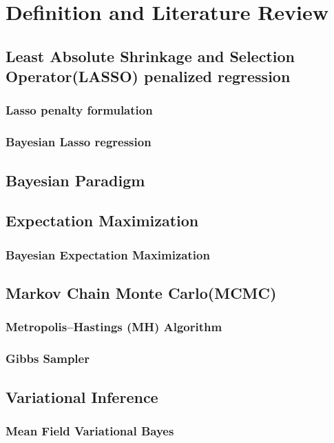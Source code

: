 \chapter{Definition and Literature Review}
\label{Chapter2}
\section{Least Absolute Shrinkage and Selection Operator(LASSO) penalized regression}
\subsection{Lasso penalty formulation}
\subsection{Bayesian Lasso regression}

\section{Bayesian Paradigm}

\section{Expectation Maximization}
\subsection{Bayesian Expectation Maximization}

\section{Markov Chain Monte Carlo(MCMC)}
\label{MCMC}
\subsection{Metropolis–Hastings (MH) Algorithm}
\subsection{Gibbs Sampler}

\section{Variational Inference}
\label{VI}
\subsection{Mean Field Variational Bayes}







